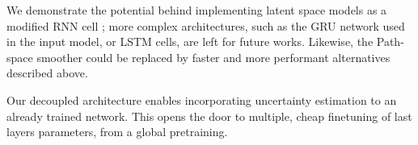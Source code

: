 \documentclass{article}
\begin{document}
We demonstrate the potential behind implementing latent space models as a modified RNN cell ;
more complex architectures, such as the GRU network used in the input model, or LSTM cells, are left for future works.
Likewise, the Path-space smoother could be replaced by faster and more performant alternatives described above.

Our decoupled architecture enables incorporating uncertainty estimation to an already trained network.
This opens the door to multiple, cheap finetuning of last layers parameters, from a global pretraining.







\end{document}
